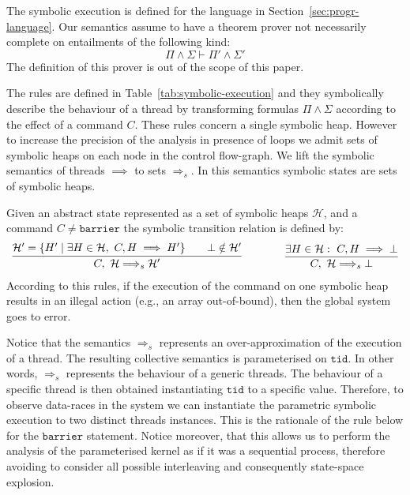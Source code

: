 \documentclass[a4paper,11pt]{llncs}
\newcommand{\tid}{\texttt{tid}}
\newcommand{\barrier}{\texttt{barrier}\xspace}
\begin{document}
 The symbolic execution is defined for the language in Section~\ref{sec:progr-language}. 
 Our semantics assume to have a theorem prover not necessarily complete on entailments of the following kind:
 \[
	\Pi \wedge \Sigma \vdash \Pi' \wedge \Sigma'
 \]
The definition of this prover is out of the scope of this paper.
 
The rules are defined in Table~\ref{tab:symbolic-execution} and they symbolically describe the behaviour of a thread by transforming formulas $\Pi\wedge\Sigma$ according to the effect of a command $C$. These rules concern a single symbolic heap. However to increase the precision of the analysis in presence of loops we 
admit sets of symbolic heaps on each node in the control flow-graph.
We lift the symbolic semantics of threads $\implies$ to sets 
 $\Longrightarrow_s$. In this semantics symbolic states are sets of symbolic heaps.
 
 Given an abstract state represented as a set of symbolic heaps $\mathcal{H}$, and a command $C \neq \barrier$ the symbolic transition relation is defined by:
\[\begin{array}{ccc}
	\infer{C,~ \mathcal{H} \Longrightarrow_s  {\cal H'}}{ {\cal H'}=\{ H' \mid \exists H \in \mathcal{H},~ C, H \implies H' \}  \qquad \bot \notin {\cal H'}}
	& \qquad &
		\infer{C,~ \mathcal{H} \Longrightarrow_s  \bot}{   \exists H \in \mathcal{H}: ~ C, H \implies \bot }
\end{array}
\]
According to this rules, if the execution of the command on one symbolic heap results in an illegal action (e.g., an array out-of-bound), then the global system goes to error.

Notice that the semantics $\Longrightarrow_s$ represents an over-approximation of the execution of a thread. The resulting collective semantics is parameterised on $\tid$. In other words, $\Longrightarrow_s$ represents the behaviour of a generic threads. The behaviour of a specific thread is then obtained instantiating $\tid$ to a
specific value. Therefore, to observe data-races in the system we can instantiate the parametric symbolic execution to two distinct threads instances. This is the rationale of the rule below for the $\barrier$ statement. 
Notice moreover, that this allows us to perform the analysis of the parameterised kernel as if it was a sequential process, therefore avoiding to consider all possible interleaving and consequently state-space explosion. 
\end{document}
